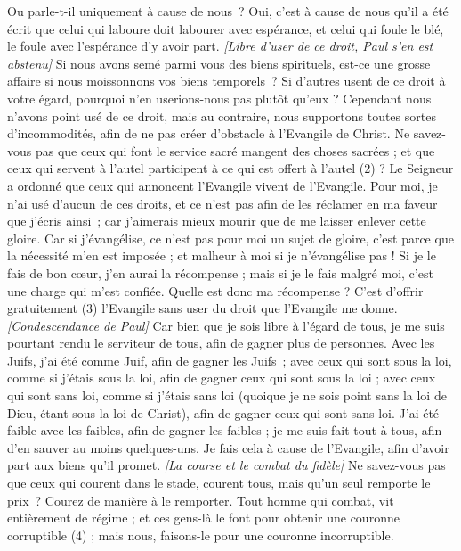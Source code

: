 \begin{multicols}{2}
Ou parle-t-il uniquement à cause de nous ? Oui, c’est à cause de nous qu’il a été écrit que celui qui laboure doit labourer avec espérance, et celui qui foule le blé, le foule avec l’espérance d’y avoir part.
\textit{[Libre d'user de ce droit, Paul s'en est abstenu]}
Si nous avons semé parmi vous des biens spirituels, est-ce une grosse affaire si nous moissonnons vos biens temporels ?
Si d'autres usent de ce droit à votre égard, pourquoi n'en userions-nous pas plutôt qu'eux ? Cependant nous n'avons point usé de ce droit, mais au contraire, nous supportons toutes sortes d'incommodités, afin de ne pas créer d’obstacle à l'Evangile de Christ.
Ne savez-vous pas que ceux qui font le service sacré mangent des choses sacrées ; et que ceux qui servent à l'autel participent à ce qui est offert à l'autel (2) ?
Le Seigneur a ordonné que ceux qui annoncent l'Evangile vivent de l'Evangile.
Pour moi, je n’ai usé d’aucun de ces droits, et ce n’est pas afin de les réclamer en ma faveur que j’écris ainsi ; car j’aimerais mieux mourir que de me laisser enlever cette gloire.
Car si j'évangélise, ce n’est pas pour moi un sujet de gloire, c’est parce que la nécessité m'en est imposée ; et malheur à moi si je n'évangélise pas !
Si je le fais de bon cœur, j’en aurai la récompense ; mais si je le fais malgré moi, c’est une charge qui m’est confiée.
Quelle est donc ma récompense ? C’est d’offrir gratuitement (3) l’Evangile sans user du droit que l'Evangile me donne.
\textit{[Condescendance de Paul]}
Car bien que je sois libre à l'égard de tous, je me suis pourtant rendu le serviteur de tous, afin de gagner plus de personnes.
Avec les Juifs, j’ai été comme Juif, afin de gagner les Juifs ; avec ceux qui sont sous la loi, comme si j'étais sous la loi, afin de gagner ceux qui sont sous la loi ;
avec ceux qui sont sans loi, comme si j'étais sans loi (quoique je ne sois point sans la loi de Dieu, étant sous la loi de Christ), afin de gagner ceux qui sont sans loi.
J’ai été faible avec les faibles, afin de gagner les faibles ; je me suis fait tout à tous, afin d’en sauver au moins quelques-uns.
Je fais cela à cause de l'Evangile, afin d’avoir part aux biens qu’il promet.
\textit{[La course et le combat du fidèle]}
Ne savez-vous pas que ceux qui courent dans le stade, courent tous, mais qu’un seul remporte le prix ? Courez de manière à le remporter.
Tout homme qui combat, vit entièrement de régime ; et ces gens-là le font pour obtenir une couronne corruptible (4) ; mais nous, faisons-le pour une couronne incorruptible.

\end{multicols}
